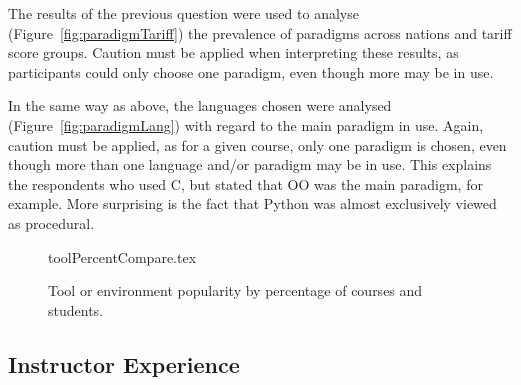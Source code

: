 \documentclass{sig-alternate}
\begin{document}
The results of the previous question were used to analyse (Figure~\ref{fig:paradigmTariff}) the
prevalence of paradigms across nations and tariff score groups. Caution must
be applied when interpreting these results, as participants could only
choose one paradigm, even though more may be in use. 


In the same way as above, the languages chosen were analysed (Figure~\ref{fig:paradigmLang}) with
regard to the main paradigm in use. Again, caution must be applied, as for
a given course, only one paradigm is chosen, even though more than one
language and/or paradigm may be in use. This explains the respondents who used C, but stated that OO was the main paradigm, for example. More surprising is the fact that Python was almost exclusively viewed as procedural.




%

\begin{figure}[ht]
\begin{center}
{toolPercentCompare.tex}\vskip-18pt
\caption{Tool or environment popularity by percentage of courses and students.\label{fig:tools}}
\end{center}
\end{figure}

\subsection{Instructor Experience}
\end{document}
